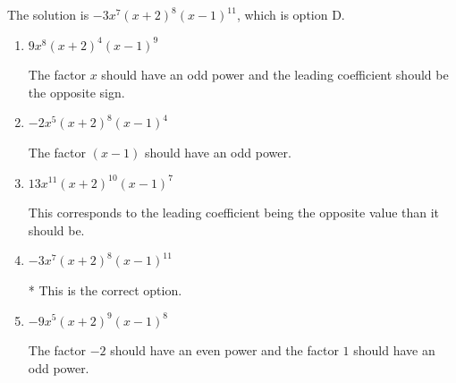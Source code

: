\documentclass{extbook}[14pt]
\begin{document}
\begin{enumerate}
{The solution is \( -3x^{7} (x + 2)^{8} (x - 1)^{11} \), which is option D.\begin{enumerate}[label=\Alph*.]
\item \( 9x^{8} (x + 2)^{4} (x - 1)^{9} \)

The factor $x$ should have an odd power and the leading coefficient should be the opposite sign.
\item \( -2x^{5} (x + 2)^{8} (x - 1)^{4} \)

The factor $(x - 1)$ should have an odd power.
\item \( 13x^{11} (x + 2)^{10} (x - 1)^{7} \)

This corresponds to the leading coefficient being the opposite value than it should be.
\item \( -3x^{7} (x + 2)^{8} (x - 1)^{11} \)

* This is the correct option.
\item \( -9x^{5} (x + 2)^{9} (x - 1)^{8} \)

The factor $-2$ should have an even power and the factor $1$ should have an odd power.
\end{enumerate}

}
\end{enumerate}
\end{document}
